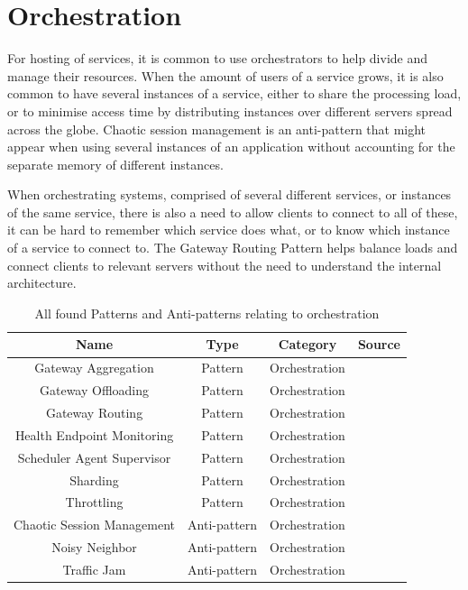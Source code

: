 \documentclass[a4paper,UKenglish]{dagrep}
\begin{document}
\section{Orchestration}

For hosting of services, it is common to use orchestrators to help divide and manage their resources. When the amount of users of a service grows, it is also common to have several instances of a service, either to share the processing load, or to minimise access time by distributing instances over different servers spread across the globe. Chaotic session management is an anti-pattern that might appear when using several instances of an application without accounting for the separate memory of different instances.

When orchestrating systems, comprised of several different services, or instances of the same service, there is also a need to allow clients to connect to all of these, it can be hard to remember which service does what, or to know which instance of a service to connect to. The Gateway Routing Pattern helps balance loads and connect clients to relevant servers without the need to understand the internal architecture.

\begin{table}[H]
	\begin{tabular}{c|ccc}
		Name                       & Type    & Category           & Source                                    \\\hline
		Gateway Aggregation        & Pattern & Orchestration      & \cite{microsoft2024performanceefficiency} \\
		Gateway Offloading         & Pattern & Orchestration      & \cite{microsoft2024performanceefficiency} \\
		Gateway Routing            & Pattern & Orchestration      & \cite{microsoft2024performanceefficiency} \\
		Health Endpoint Monitoring & Pattern & Orchestration      & \cite{microsoft2024performanceefficiency} \\
		Scheduler Agent Supervisor & Pattern & Orchestration      & \cite{microsoft2024performanceefficiency} \\
		Sharding                   & Pattern & Orchestration      & \cite{microsoft2024performanceefficiency} \\
		Throttling                 & Pattern & Orchestration      & \cite{microsoft2024performanceefficiency} \\
		Chaotic Session Management        & Anti-pattern & Orchestration      & \cite{tate2002bitter}                                   \\
		Noisy Neighbor                    & Anti-pattern & Orchestration      & \cite{MicrosoftAntipatterns}                            \\
		Traffic Jam                       & Anti-pattern & Orchestration      & \cite{detect_antipatterns}                              \\
	\end{tabular}
	\caption{All found Patterns and Anti-patterns relating to orchestration}
	\label{tab:patterns}
\end{table}
\end{document}
